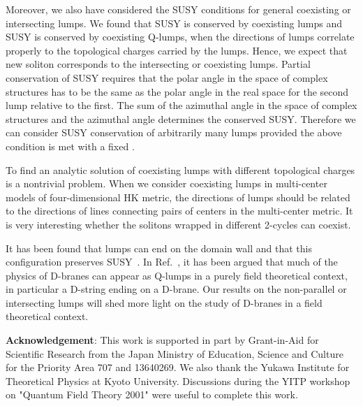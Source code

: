 \documentclass[a4paper,12pt]{article}
\begin{document}
Moreover, we also have considered the SUSY conditions for general 
coexisting or intersecting lumps. We found that 
\coordHE{} SUSY is conserved by coexisting lumps and \coordHE{} SUSY is conserved 
by coexisting Q-lumps, when the directions of lumps correlate properly 
to the topological charges carried by the lumps. 
Hence, we expect that new soliton corresponds to the intersecting or 
coexisting lumps. 
Partial conservation of SUSY requires that the polar angle \coordHE{} 
in the space of complex structures has to be the same 
as the polar angle \myHighlight{$\theta $}\coordHE{} in the real space for the second lump 
relative to the first. 
The sum of the azimuthal angle \coordHE{} in the space of complex 
structures and the azimuthal angle \myHighlight{$\phi$}\coordHE{} determines 
the conserved SUSY.
Therefore we can consider \coordHE{} SUSY conservation of arbitrarily many 
lumps provided the above condition is met with a fixed 
\coordHE{}.

To find an analytic solution of coexisting lumps with different 
topological charges is a nontrivial problem. 
When we consider coexisting lumps in multi-center models of four-dimensional 
HK metric, the directions of lumps should be related to the directions 
of lines connecting pairs of centers in the multi-center metric. 
It is very interesting whether the solitons 
wrapped in different 2-cycles can coexist. 

It has been found that lumps can end on the domain wall 
and that this configuration preserves \coordHE{} SUSY~\cite{Townsend2}. 
In Ref.~\cite{Townsend2}, it has been argued that much of the physics of 
D-branes can appear as Q-lumps in a purely field theoretical context, 
in particular a D-string ending on a D-brane. 
Our results on the non-parallel or intersecting lumps will shed more light on 
the study of D-branes in a field theoretical context. 

\vspace{.5cm}
{\bf Acknowledgement}:
This work is supported in part by Grant-in-Aid 
for Scientific Research from the Japan Ministry 
of Education, Science and Culture for 
the Priority Area 707 and 13640269. 
We also thank the Yukawa Institute for Theoretical Physics 
at Kyoto University.  
Discussions during the YITP workshop 
on "Quantum Field Theory 2001"  were useful to complete this work. 

\end{document}
